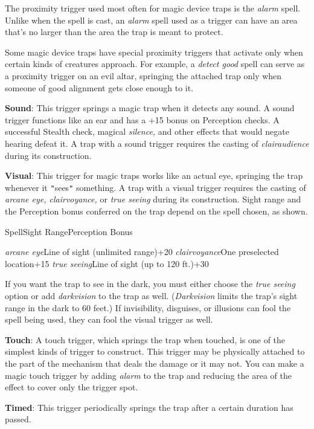 The proximity trigger used most often for magic device traps is the \textit{alarm }spell. Unlike when the spell is cast, an \textit{alarm }spell used as a trigger can have an area that's no larger than the area the trap is meant to protect.
				
Some magic device traps have special proximity triggers that activate only when certain kinds of creatures approach. For example, a \textit{detect good }spell can serve as a proximity trigger on an evil altar, springing the attached trap only when someone of good alignment gets close enough to it.
				
\textbf{Sound}: This trigger springs a magic trap when it detects any sound. A sound trigger functions like an ear and has a +15 bonus on Perception checks. A successful Stealth check, magical \textit{silence, }and other effects that would negate hearing defeat it. A trap with a sound trigger requires the casting of \textit{clairaudience }during its construction.
				
\textbf{Visual}: This trigger for magic traps works like an actual eye, springing the trap whenever it \texttt{{}"{}}sees\texttt{{}"{}} something. A trap with a visual trigger requires the casting of \textit{arcane eye, clairvoyance, }or \textit{true seeing }during its construction. Sight range and the Perception bonus conferred on the trap depend on the spell chosen, as shown.

SpellSight RangePerception Bonus

\textit{arcane eye}Line of sight (unlimited range)+20
\textit{clairvoyance}One preselected location+15
\textit{true seeing}Line of sight (up to 120 ft.)+30

				
If you want the trap to see in the dark, you must either choose the \textit{true seeing }option or add \textit{darkvision }to the trap as well. (\textit{Darkvision }limits the trap's sight range in the dark to 60 feet.) If invisibility, disguises, or illusions can fool the spell being used, they can fool the visual trigger as well. 
				
\textbf{Touch}: A touch trigger, which springs the trap when touched, is one of the simplest kinds of trigger to construct. This trigger may be physically attached to the part of the mechanism that deals the damage or it may not. You can make a magic touch trigger by adding \textit{alarm }to the trap and reducing the area of the effect to cover only the trigger spot.
				
\textbf{Timed}: This trigger periodically springs the trap after a certain duration has passed.
				
